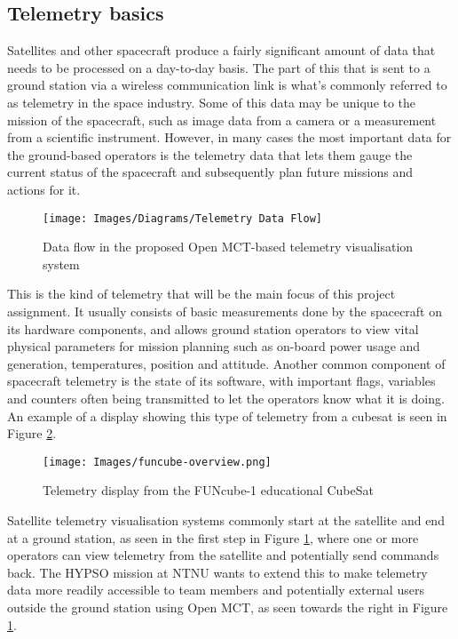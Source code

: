 \subsection{Telemetry basics}
Satellites and other spacecraft produce a fairly significant amount of data that needs to be processed on a day-to-day basis. The part of this that is sent to a ground station via a wireless communication link is what's commonly referred to as \gls{telemetry} in the space industry. Some of this data may be unique to the mission of the spacecraft, such as image data from a camera or a measurement from a scientific instrument. However, in many cases the most important data for the ground-based operators is the telemetry data that lets them gauge the current status of the spacecraft and subsequently plan future missions and actions for it.

\begin{figure}[H]
    \centering
    \texttt{[image: Images/Diagrams/Telemetry Data Flow]}
    \caption{Data flow in the proposed Open MCT-based telemetry visualisation system}
    \label{fig:telemetryflow}
\end{figure}

This is the kind of telemetry that will be the main focus of this project assignment. It usually consists of basic measurements done by the spacecraft on its hardware components, and allows ground station operators to view vital physical parameters for mission planning such as on-board power usage and generation, temperatures, position and attitude. Another common component of spacecraft telemetry is the state of its software, with important flags, variables and counters often being transmitted to let the operators know what it is doing. An example of a display showing this type of telemetry from a \Gls{cubesat} is seen in Figure \ref{fig:funcube}.

\begin{figure}[ht]
    \centering
    \texttt{[image: Images/funcube-overview.png]}
    \caption{Telemetry display from the FUNcube-1 educational CubeSat \cite{funcube}}
    \label{fig:funcube}
\end{figure}

Satellite telemetry visualisation systems commonly start at the satellite and end at a ground station, as seen in the first step in Figure \ref{fig:telemetryflow}, where one or more operators can view telemetry from the satellite and potentially send commands back. The HYPSO mission at NTNU wants to extend this to make telemetry data more readily accessible to team members and potentially external users outside the ground station using Open MCT, as seen towards the right in Figure \ref{fig:telemetryflow}.

